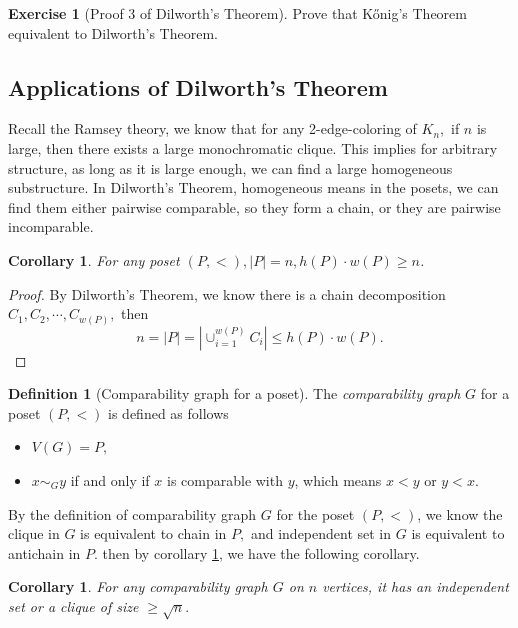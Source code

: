 \documentclass{article}
\newtheorem{corollary}[theorem]{Corollary}
\theoremstyle{definition}
\newtheorem{definition}[theorem]{Definition}
\newtheorem{exercise}[theorem]{Exercise}
\begin{document}
\begin{exercise}[Proof 3 of Dilworth's Theorem]
    Prove that K\H{o}nig's Theorem equivalent to Dilworth's Theorem.
\end{exercise}

\subsection{Applications of Dilworth's Theorem}

Recall the Ramsey theory, we know that for any 2-edge-coloring of $K_n,$ if $n$ is large, then there exists a large monochromatic clique. This implies for arbitrary structure, as long as it is large enough, we can find a large homogeneous substructure. In Dilworth's Theorem, homogeneous means in the posets, we can find them either pairwise comparable, so they form a chain, or they are pairwise incomparable.

\begin{corollary}\label{cor:sqrt n in poset}
    For any poset $(P,<),|P|=n, h(P)\cdot w(P)\geq n$.
\end{corollary}

\begin{proof}
    By Dilworth's Theorem, we know there is a chain decomposition $C_1,C_2,\cdots,C_{w(P)},$ then
    \[n=|P|=|\cup_{i=1}^{w(P)}C_i|\leq h(P)\cdot w(P).\]
\end{proof}

\begin{definition}[Comparability graph for a poset]
    The \emph{comparability graph} $G$ for a poset $(P,<)$ is defined as follows
    \begin{itemize}
        \item $V(G)=P,$

        \item $x\sim_{G}y$ if and only if $x$ is comparable with $y$, which means $x<y$ or $y<x.$
    \end{itemize}
\end{definition}

By the definition of comparability graph $G$ for the poset $(P,<)$, we know the clique in $G$ is equivalent to chain in $P,$ and independent set in $G$ is equivalent to antichain in $P.$ then by corollary \ref{cor:sqrt n in poset}, we have the following corollary.

\begin{corollary}
    For any comparability graph $G$ on $n$ vertices, it has an independent set or a clique of size $\geq \sqrt{n}.$
\end{corollary}
\end{document}
